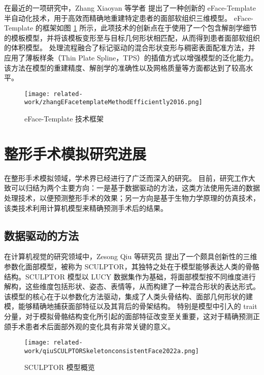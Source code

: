在最近的一项研究中，Zhang Xiaoyan 等学者 \cite{zhangEFacetemplateMethodEfficiently2016} 提出了一种创新的 eFace-Template 半自动化技术，用于高效而精确地重建特定患者的面部软组织三维模型。
eFace-Template 的框架如图 \ref{fig:zhangEFacetemplateMethodEfficiently2016} 所示，此项技术的创新点在于使用了一个包含解剖学细节的模板模型，并将该模板变形至与目标几何形状相匹配，从而得到患者面部软组织的体积模型。
处理流程融合了标记驱动的混合形状变形与稠密表面配准方法，并应用了薄板样条（Thin Plate Spline，TPS）的插值方式以增强模型的泛化能力。
该方法在模型的重建精度、解剖学的准确性以及网格质量等方面都达到了较高水平。

\begin{figure}
  \centering
  \texttt{[image: related-work/zhangEFacetemplateMethodEfficiently2016.png]}
  \caption{eFace-Template 技术框架 \cite{zhangEFacetemplateMethodEfficiently2016}}
  \label{fig:zhangEFacetemplateMethodEfficiently2016}
\end{figure}

\section{整形手术模拟研究进展}

在整形手术模拟领域，学术界已经进行了广泛而深入的研究。
目前，研究工作大致可以归结为两个主要方向：一是基于数据驱动的方法，这类方法使用先进的数据处理技术，以便预测整形手术的效果；另一方向是基于生物力学原理的仿真技术，该类技术利用计算机模型来精确预测手术后的结果。

\subsection{数据驱动的方法}

在计算机视觉的研究领域中，Zesong Qiu 等研究员 \cite{qiuSCULPTORSkeletonconsistentFace2022a} 提出了一个颇具创新性的三维参数化面部模型，被称为 SCULPTOR，其独特之处在于模型能够表达人类的骨骼结构。SCULPTOR 模型以 LUCY 数据集作为基础，将面部模型按不同维度进行解构，这些维度包括形状、姿态、表情等，从而构建了一种混合形状的表达形式。
该模型的核心在于以参数化方法驱动，集成了人类头骨结构、面部几何形状的建模，能够精确地捕获面部特征以及其背后的骨架结构。
特别是模型中引入的 trait 分量，对于模拟骨骼结构变化所引起的面部特征改变至关重要，这对于精确预测正颌手术患者术后面部外观的变化具有非常关键的意义。

\begin{figure}
  \centering
  \texttt{[image: related-work/qiuSCULPTORSkeletonconsistentFace2022a.png]}
  \caption{SCULPTOR 模型概览 \cite{qiuSCULPTORSkeletonconsistentFace2022a}}
  \label{fig:qiuSCULPTORSkeletonconsistentFace2022a}
\end{figure}

